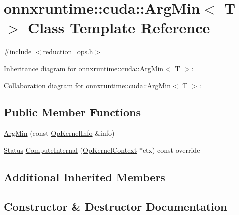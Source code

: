\hypertarget{classonnxruntime_1_1cuda_1_1ArgMin}{}\section{onnxruntime\+:\+:cuda\+:\+:Arg\+Min$<$ T $>$ Class Template Reference}
\label{classonnxruntime_1_1cuda_1_1ArgMin}


{\ttfamily \#include $<$reduction\+\_\+ops.\+h$>$}



Inheritance diagram for onnxruntime\+:\+:cuda\+:\+:Arg\+Min$<$ T $>$\+:


Collaboration diagram for onnxruntime\+:\+:cuda\+:\+:Arg\+Min$<$ T $>$\+:
\subsection*{Public Member Functions}
\begin{DoxyCompactItemize}
\item 
\mbox{\hyperlink{classonnxruntime_1_1cuda_1_1ArgMin_a69f5b89320362b534bdbcae334036a13}{Arg\+Min}} (const \mbox{\hyperlink{classonnxruntime_1_1OpKernelInfo}{Op\+Kernel\+Info}} \&info)
\item 
\mbox{\hyperlink{classonnxruntime_1_1common_1_1Status}{Status}} \mbox{\hyperlink{classonnxruntime_1_1cuda_1_1ArgMin_a2284dff807b92224f079e97210383b64}{Compute\+Internal}} (\mbox{\hyperlink{classonnxruntime_1_1OpKernelContext}{Op\+Kernel\+Context}} $\ast$ctx) const override
\end{DoxyCompactItemize}
\subsection*{Additional Inherited Members}


\subsection{Constructor \& Destructor Documentation}
\mbox{\label{classonnxruntime_1_1cuda_1_1ArgMin_a69f5b89320362b534bdbcae334036a13}} 
